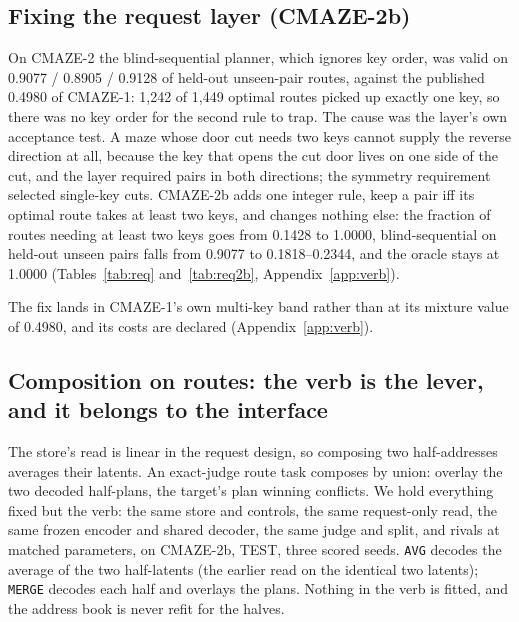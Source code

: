 \documentclass{article} %
\begin{document}
\subsection{Fixing the request layer (CMAZE-2b)}
\label{sec:req-layer}

On CMAZE-2 the blind-sequential planner, which ignores key order, was valid on 0.9077 /
0.8905 / 0.9128 of held-out unseen-pair routes, against the published 0.4980 of CMAZE-1: 1,242
of 1,449 optimal routes picked up exactly one key, so there was no key order for the second rule
to trap. %
The cause was the layer's own acceptance test. A maze whose door cut needs two keys cannot
supply the reverse direction at all, because the key that opens the cut door lives on one side
of the cut, and the layer required pairs in both directions; the symmetry requirement selected
single-key cuts. %
CMAZE-2b adds one integer rule, keep a pair iff its optimal route takes at least two keys, and
changes nothing else: the fraction of routes needing at least two keys goes from 0.1428 to
1.0000, blind-sequential on held-out unseen pairs falls from 0.9077 to 0.1818--0.2344, and the
oracle stays at 1.0000 (Tables~\ref{tab:req} and~\ref{tab:req2b}, Appendix~\ref{app:verb}). %

The fix lands in CMAZE-1's own multi-key band rather than at its mixture value of 0.4980, and %
its costs are declared (Appendix~\ref{app:verb}).

\subsection{Composition on routes: the verb is the lever, and it belongs to the interface}
\label{sec:verb}

The store's read is linear in the request design, so composing two half-addresses averages
their latents. An exact-judge route task composes by union: overlay the two decoded half-plans,
the target's plan winning conflicts. We hold everything fixed but the verb: the same store and
controls, the same request-only read, the same frozen encoder and shared decoder, the same
judge and split, and rivals at matched parameters, on CMAZE-2b, TEST, three scored seeds.
\texttt{AVG} decodes the average of the two half-latents (the earlier read on the identical two
latents); \texttt{MERGE} decodes each half and overlays the plans. Nothing in the verb is
fitted, and the address book is never refit for the halves. %
\end{document}
